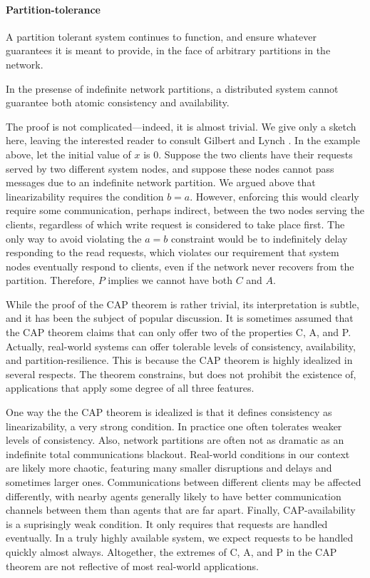 \paragraph{Partition-tolerance}

A partition tolerant system continues to function, and ensure whatever
guarantees it is meant to provide, in the face of arbitrary partitions
in the network.

\begin{theorem}
In the presense of indefinite network partitions, a distributed system
cannot guarantee both atomic consistency and availability.
\end{theorem}

The proof is not complicated---indeed, it is almost trivial. We give
only a sketch here, leaving the interested reader to consult Gilbert
and Lynch \cite{}. In the example above, let the initial value of $x$
is $0$. Suppose the two clients have their requests served by two
different system nodes, and suppose these nodes cannot pass messages
due to an indefinite network partition. We argued above that
linearizability requires the condition $b = a$.  However, enforcing
this would clearly require some communication, perhaps indirect,
between the two nodes serving the clients, regardless of which write
request is considered to take place first. The only way to avoid
violating the $a = b$ constraint would be to indefinitely delay
responding to the read requests, which violates our requirement that
system nodes eventually respond to clients, even if the network never
recovers from the partition. Therefore, $P$ implies we cannot have
both $C$ and $A$.

While the proof of the CAP theorem is rather trivial, its
interpretation is subtle, and it has been the subject of popular
discussion. It is sometimes assumed that the CAP theorem claims that
can only offer two of the properties C, A, and P. Actually, real-world
systems can offer tolerable levels of consistency, availability, and
partition-resilience. This is because the CAP theorem is highly
idealized in several respects. The theorem constrains, but does not
prohibit the existence of, applications that apply some degree of all
three features.

One way the the CAP theorem is idealized is that it defines
consistency as linearizability, a very strong condition. In practice
one often tolerates weaker levels of consistency. Also, network
partitions are often not as dramatic as an indefinite total
communications blackout. Real-world conditions in our context are
likely more chaotic, featuring many smaller disruptions and delays and
sometimes larger ones. Communications between different clients may be
affected differently, with nearby agents generally likely to have
better communication channels between them than agents that are far
apart. Finally, CAP-availability is a suprisingly weak condition. It
only requires that requests are handled eventually. In a truly highly
available system, we expect requests to be handled quickly almost
always. Altogether, the extremes of C, A, and P in the CAP theorem are
not reflective of most real-world applications.

